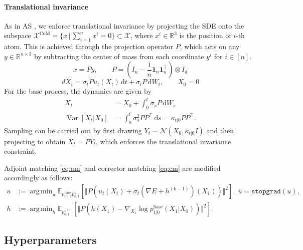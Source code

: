 \documentclass[]{fairmeta}
\DeclareMathOperator*{\argmin}{arg\,min}
\theoremstyle{remark}
\begin{document}
\paragraph{Translational invariance}
As in AS \citep{havens2025adjoint}, we enforce translational invariance by projecting the SDE onto the subspace $\mathcal{X}^\text{CoM} = \{ x \, \vert \, \sum_{i=1}^n x^i = 0 \} \subset \mathcal{X}$, where $x^i \in \mathbb{R}^3$ is the position of $i$-th atom.
This is achieved through the projection operator $P$, which acts on any $y \in \mathbb{R}^{n \times 3}$ by subtracting the center of mass from each coordinate $y^i$ for $i \in [n]$.
\begin{equation}
x = P y, \qquad P = \left( I_n - \frac{1}{n} \bm{1}_n \bm{1}_n^\top \right) \otimes I_d
\end{equation}
\begin{equation}
dX_t = \sigma_t P u_t (X_t) \, \mathrm{d}t + \sigma_t P \, \mathrm{d} W_t, \qquad X_0 = 0
\end{equation}
For the base process, the dynamics are given by
\begin{align}
X_t &= X_0 + \int_0^t \sigma_s P \, \mathrm{d}W_s \\
\operatorname{Var}[X_t | X_0] &= \int_0^t \sigma_s^2 PP^\top \, \mathrm{d}s = \kappa_{t|0} PP^\top.
\end{align}
Sampling can be carried out by first drawing $Y_t \sim \mathcal{N}(X_0, \kappa_{t|0} I)$ and then projecting to obtain $X_t = P Y_t$, which enforces the translational invariance constraint.

Adjoint matching \cref{eq:am} and corrector matching \cref{eq:cm} are modified accordingly as follows:
\begin{align}
u &:= \argmin_u \mathbb{E}_{p_{t|0,1}^\text{base} p_{0,1}^{\bar{u}}} [ \Vert P(u_t(X_t) + \sigma_t (\nabla E + h^{(k-1)})(X_1)) \Vert^2 ], \; \bar{u} = \texttt{stopgrad}(u), \label{eq:am_proj} \\
h &:= \argmin_h \mathbb{E}_{p_{0,1}^{u^{(k)}}} [ \Vert P(h(X_1) - \nabla_{X_1} \log p_{1|0}^\text{base}(X_1 \vert X_0)) \Vert^2 ]. \label{eq:cm_proj}
\end{align}

\subsection{Hyperparameters}
\end{document}
